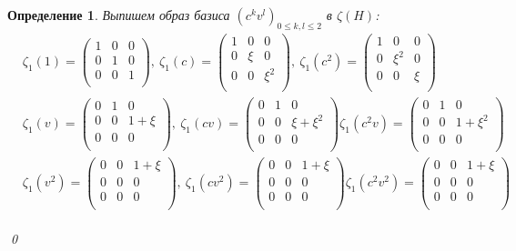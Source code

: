 \documentclass[12pt, reqno, a4paper, oneside, notitlepage]{amsart}
\makeatletter
\theoremstyle{mytheoremstyle}
\theoremstyle{myremarkstyle}
\newtheorem{definition}[theorem]{Определение}
\numberwithin{equation}{section}
\renewenvironment{proof}[1][\proofname]{\par\indent {\bfseries #1\@addpunct{.} }}{\qed}
\makeatother
\begin{document}
\begin{definition}
\begin{proof}
    Выпишем образ базиса $(c^kv^l)_{0 \leq k,l \leq 2}$ в $\zeta(H)$:
    \begin{eqnarray*}
    &\zeta_1(1) = \begin{pmatrix}
    1 & 0 & 0\\
    0 & 1 & 0\\
    0 & 0 & 1\\
    \end{pmatrix},\
    \zeta_1(c) = \begin{pmatrix}
    1 & 0 & 0\\
    0 & \xi & 0\\
    0 & 0 & \xi^2\\
    \end{pmatrix},\
    \zeta_1(c^2) = \begin{pmatrix}
    1 & 0 & 0\\
    0 & \xi^2 & 0\\
    0 & 0 & \xi\\
    \end{pmatrix}\\
    &\zeta_1(v) = \begin{pmatrix}
    0 & 1 & 0\\
    0 & 0 & 1+\xi\\
    0 & 0 & 0\\
    \end{pmatrix},\
    \zeta_1(cv) = \begin{pmatrix}
    0 & 1 & 0\\
    0 & 0 & \xi+\xi^2\\
    0 & 0 & 0\\
    \end{pmatrix} 
    \zeta_1(c^2v) = \begin{pmatrix}
    0 & 1 & 0\\
    0 & 0 & 1+\xi^2\\
    0 & 0 & 0\\
    \end{pmatrix}\\
    &\zeta_1(v^2) = \begin{pmatrix}
    0 & 0 & 1+\xi\\
    0 & 0 & 0\\
    0 & 0 & 0\\
    \end{pmatrix},\
    \zeta_1(cv^2) = \begin{pmatrix}
    0 & 0 & 1+\xi\\
    0 & 0 & 0\\
    0 & 0 & 0\\
    \end{pmatrix} 
    \zeta_1(c^2v^2) = \begin{pmatrix}
    0 & 0 & 1+\xi\\
    0 & 0 & 0\\
    0 & 0 & 0\\
    \end{pmatrix}\\    
    \end{eqnarray*}


\end{proof}
\end{definition}
\end{document}
